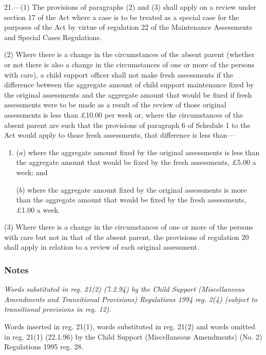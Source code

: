 \documentclass[a4paper]{article}
\newcommand\amendment[1]{\subsubsection*{Notes}{\itshape\frenchspacing\footnotesize #1 \par}}
\begin{document}
21.—(1) The provisions of paragraphs (2) and (3) shall apply on a review under section 17 of the Act where a case is to be treated as a special case for the purposes of the Act by virtue of regulation 22 of the Maintenance Assessments and Special Cases Regulations.

(2) Where there is a change in the circumstances of the absent parent (whether or not there is also a change in the circumstances of one or more of the persons with care), a child support officer shall not make fresh assessments if the difference between the aggregate amount of child support maintenance fixed by the 
original  %
assessments 
and the aggregate amount that would be fixed if fresh assessments were to be made as a result of the review 
of those original assessments  %
is less than £10.00 per week or, where the circumstances of the absent parent are such that the provisions of paragraph 6 of Schedule 1 to the Act would apply to those fresh assessments, 
that difference is less than—
\begin{enumerate}\item[]
($a$) where the aggregate amount fixed by the original assessments is less than the aggregate amount that would be fixed by the fresh assessments, £5.00 a week; and

($b$) where the aggregate amount fixed by the original assessments is more than the aggregate amount that would be fixed by the fresh assessments, £1.00 a week.
\end{enumerate} %

(3) Where there is a change in the circumstances of one or more of the persons with care but not in that of the absent parent, the provisions of regulation 20 shall apply in relation to 
a review of each original assessment.  %

\amendment{
Words substituted in reg. 21(2) (7.2.94) by the Child Support (Miscellaneous Amendments and Transitional Provisions) Regulations 1994 reg. 2(4) (subject to transitional provisions in reg. 12).

Words inserted in reg. 21(1), words substituted in reg. 21(2) and words omitted in reg. 21(1) (22.1.96) by the Child Support (Miscellaneous Amendments) (No. 2) Regulations 1995 reg. 28.
}
\end{document}
